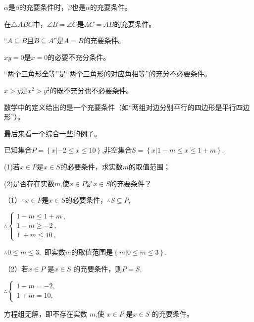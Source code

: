 \documentclass[lang=cn,math=cm,chinesefont=nofont,11pt,scheme=chinese,twocol]{elegantbook}
\begin{document}
\begin{remark}
  $\alpha$是$\beta$的充要条件时，$\beta$也是$\alpha$的充要条件。
\end{remark}

\hspace*{\fill}

\begin{example}
  在$\triangle ABC$中，$\angle B=\angle C$是$AC=AB$的充要条件。
\end{example}

\begin{example}
  “$A\subseteq B$且$B\subseteq A”$是$A=B$的充要条件。
\end{example}

\begin{example}
  $xy=0$是$x=0$的必要不充分条件。
\end{example}

\begin{example}
  “两个三角形全等”是“两个三角形的对应角相等”的充分不必要条件。
\end{example}

\begin{example}
  $x>y$是$x^2>y^2$的既不充分也不必要条件。
\end{example}

\begin{example}
  数学中的定义给出的是一个充要条件（如“两组对边分别平行的四边形是平行四边形”）。
\end{example}

\hspace*{\fill}

最后来看一个综合一些的例子。

\begin{example}\label{2022BST_Math_BX1_RJA_P18.20}
  已知集合$P=\left\{x|-2\leq x\leqslant10\right\}$,非空集合$S=\left\{x|1-m\leqslant x\leqslant1+m\right\}.$

  (1)若$x\in P$是$x\in S$的必要条件，求实数$m$的取值范围；

  (2)是否存在实数$m$,使$x\in P$是$x\in S$的充要条件？
\end{example}

\begin{solution}
  （1）$\because x\in P$是$x\in S$的必要条件，$\therefore S\subseteq P$,

  $\therefore\begin{cases}1-m\leqslant1+m\:,\\1-m\geqslant-2\:,\\1\:+m\leqslant10\:,\end{cases}$
  
  $\therefore 0\leqslant m\leqslant 3,$
  即实数$m$的取值范围是$\left\{m|0\leqslant m\leqslant3\right\}.$

  （2）若$x\in P$ 是$x\in S$ 的充要条件，则$P=S$,

  $\therefore\begin{cases}1-m=-2,\\1+m=10,\end{cases}$
  
  方程组无解，即不存在实数 $m$,使 $x\in P$ 是$x\in S$ 的充要条件。
\end{solution}
\end{document}
